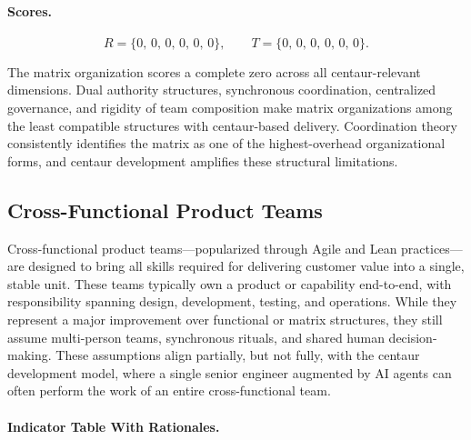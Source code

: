 \documentclass[11pt, a4paper, twocolumn]{article} %
\begin{document}
\paragraph{Scores.}

\[
R = \{0,\,0,\,0,\,0,\,0,\,0\},
\qquad
T = \{0,\,0,\,0,\,0,\,0,\,0\}.
\]

The matrix organization scores a complete zero across all centaur-relevant
dimensions. Dual authority structures, synchronous coordination, centralized
governance, and rigidity of team composition make matrix organizations among
the least compatible structures with centaur-based delivery. Coordination
theory consistently identifies the matrix as one of the highest-overhead
organizational forms, and centaur development amplifies these structural
limitations.

\newpage
\subsection*{Cross-Functional Product Teams}

Cross-functional product teams---popularized through Agile and Lean practices---are
designed to bring all skills required for delivering customer value into a
single, stable unit. These teams typically own a product or capability
end-to-end, with responsibility spanning design, development, testing, and
operations. While they represent a major improvement over functional or matrix
structures, they still assume multi-person teams, synchronous rituals, and
shared human decision-making. These assumptions align partially, but not fully,
with the centaur development model, where a single senior engineer augmented by
AI agents can often perform the work of an entire cross-functional team.

\paragraph{Indicator Table With Rationales.}
\end{document}
